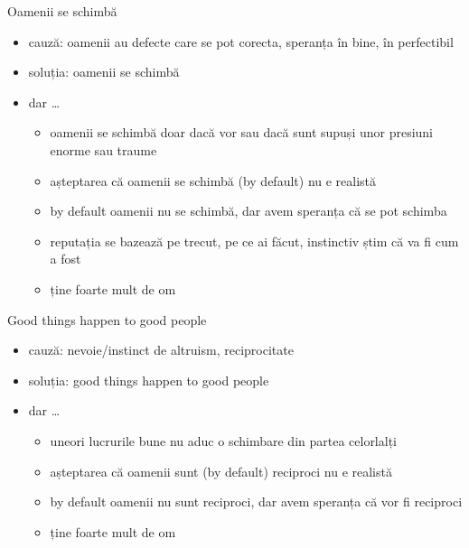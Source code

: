 \documentclass{simple}
\begin{document}
\begin{frame}{Oamenii se schimbă}
  \begin{itemize}
    \pause \item cauză: oamenii au defecte care se pot corecta, speranța în bine, în perfectibil
    \pause \item soluția: oamenii se schimbă
    \pause \item dar \ldots
      \begin{itemize}
        \pause \item oamenii se schimbă doar dacă vor sau dacă sunt supuși unor presiuni enorme sau traume
        \pause \item așteptarea că oamenii se schimbă (by default) nu e realistă
        \pause \item by default oamenii nu se schimbă, dar avem speranța că se pot schimba
        \pause \item reputația se bazează pe trecut, pe ce ai făcut, instinctiv știm că va fi cum a fost
        \pause \item ține foarte mult de om
      \end{itemize}
  \end{itemize}
\end{frame}

\begin{frame}{Good things happen to good people}
  \begin{itemize}
    \pause \item cauză: nevoie/instinct de altruism, reciprocitate
    \pause \item soluția: good things happen to good people
    \pause \item dar \ldots
      \begin{itemize}
        \pause \item uneori lucrurile bune nu aduc o schimbare din partea celorlalți
        \pause \item așteptarea că oamenii sunt (by default) reciproci nu e realistă
        \pause \item by default oamenii nu sunt reciproci, dar avem speranța că vor fi reciproci
        \pause \item ține foarte mult de om
      \end{itemize}
  \end{itemize}
\end{frame}
\end{document}
